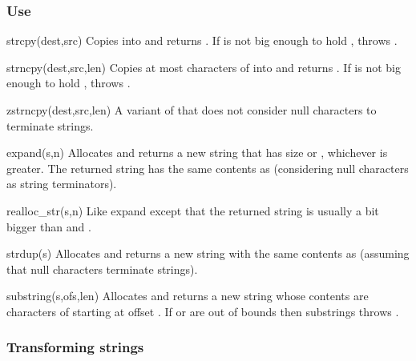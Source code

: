 \subsubsection*{Use}

\begin{defun}{strcpy}{(dest,src)}
Copies  into  and returns .  If 
is not big enough to hold ,  throws
.
\end{defun}

\begin{defun}{strncpy}{(dest,src,len)}
Copies at most  characters of  into  and
returns .  If  is not big enough to hold
,  throws
.
\end{defun}

\begin{defun}{zstrncpy}{(dest,src,len)}
A variant of  that does not consider null characters to
terminate strings.
\end{defun}

\begin{defun}{expand}{(s,n)}
Allocates and returns a new string that has size  or
, whichever is greater.  The returned string has
the same contents as  (considering null characters as string
terminators).
\end{defun}

\begin{defun}{realloc_str}{(s,n)}
Like expand except that the returned string is usually a bit bigger than
 and .
\end{defun}

\begin{defun}{strdup}{(s)}
Allocates and returns a new string with the same contents as 
(assuming that null characters terminate strings).
\end{defun}

\begin{defun}{substring}{(s,ofs,len)}
Allocates and returns a new string whose contents are 
characters of  starting at offset .  If  or
 are out of bounds then substrings throws
.
\end{defun}

\subsubsection*{Transforming strings}
